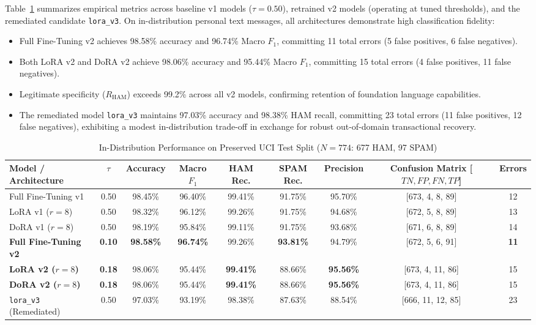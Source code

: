 \documentclass[conference]{IEEEtran}
\begin{document}
Table~\ref{tab:uci_test_results} summarizes empirical metrics across baseline v1 models ($\tau = 0.50$), retrained v2 models (operating at tuned thresholds), and the remediated candidate \texttt{lora\_v3}. On in-distribution personal text messages, all architectures demonstrate high classification fidelity:
\begin{itemize}
    \item Full Fine-Tuning v2 achieves 98.58\% accuracy and 96.74\% Macro $F_1$, committing 11 total errors (5 false positives, 6 false negatives).
    \item Both LoRA v2 and DoRA v2 achieve 98.06\% accuracy and 95.44\% Macro $F_1$, committing 15 total errors (4 false positives, 11 false negatives).
    \item Legitimate specificity ($R_{\text{HAM}}$) exceeds 99.2\% across all v2 models, confirming retention of foundation language capabilities.
    \item The remediated model \texttt{lora\_v3} maintains 97.03\% accuracy and 98.38\% HAM recall, committing 23 total errors (11 false positives, 12 false negatives), exhibiting a modest in-distribution trade-off in exchange for robust out-of-domain transactional recovery.
\end{itemize}

\begin{table}[t]
\caption{In-Distribution Performance on Preserved UCI Test Split ($N=774$: 677 HAM, 97 SPAM)}
\label{tab:uci_test_results}
\centering
\small
\begin{tabularx}{\textwidth}{lcccccccc}
\toprule
\textbf{Model / Architecture} & \textbf{$\tau$} & \textbf{Accuracy} & \textbf{Macro $F_1$} & \textbf{HAM Rec.} & \textbf{SPAM Rec.} & \textbf{Precision} & \textbf{Confusion Matrix [$TN, FP, FN, TP$]} & \textbf{Errors} \\
\midrule
Full Fine-Tuning v1 & 0.50 & 98.45\% & 96.40\% & 99.41\% & 91.75\% & 95.70\% & [673, 4, 8, 89] & 12 \\
LoRA v1 ($r=8$) & 0.50 & 98.32\% & 96.12\% & 99.26\% & 91.75\% & 94.68\% & [672, 5, 8, 89] & 13 \\
DoRA v1 ($r=8$) & 0.50 & 98.19\% & 95.84\% & 99.11\% & 91.75\% & 93.68\% & [671, 6, 8, 89] & 14 \\
\midrule
\textbf{Full Fine-Tuning v2} & \textbf{0.10} & \textbf{98.58\%} & \textbf{96.74\%} & 99.26\% & \textbf{93.81\%} & 94.79\% & [672, 5, 6, 91] & \textbf{11} \\
\textbf{LoRA v2 ($r=8$)} & \textbf{0.18} & 98.06\% & 95.44\% & \textbf{99.41\%} & 88.66\% & \textbf{95.56\%} & [673, 4, 11, 86] & 15 \\
\textbf{DoRA v2 ($r=8$)} & \textbf{0.18} & 98.06\% & 95.44\% & \textbf{99.41\%} & 88.66\% & \textbf{95.56\%} & [673, 4, 11, 86] & 15 \\
\midrule
\texttt{lora\_v3} (Remediated) & 0.50 & 97.03\% & 93.19\% & 98.38\% & 87.63\% & 88.54\% & [666, 11, 12, 85] & 23 \\
\bottomrule
\end{tabularx}
\end{table}
\end{document}
